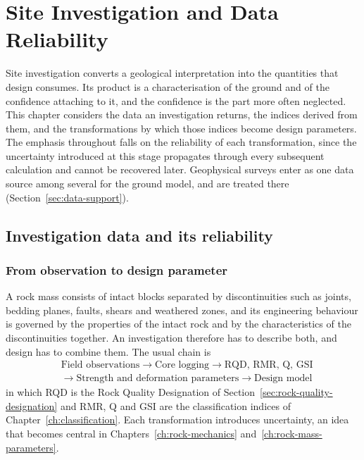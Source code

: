 \chapter{Site Investigation and Data Reliability}
\label{ch:site-investigation}

Site investigation converts a geological interpretation into the quantities
that design consumes. Its product is a
characterisation of the ground and of the confidence attaching to it, and the
confidence is the part more often neglected. This chapter
considers the data an investigation returns, the indices derived from them,
and the transformations by which those indices become design parameters. The
emphasis throughout falls on the reliability of each transformation, since the
uncertainty introduced at this stage propagates through every subsequent
calculation and cannot be recovered later. Geophysical surveys enter as one
data source among several for the ground model, and are treated there
(Section~\ref{sec:data-support}).

\section{Investigation data and its reliability}
\label{sec:investigation-data-and-its-reliability}

\subsection{From observation to design parameter}
\label{sec:observation-to-parameter}

A rock mass consists of intact blocks
separated by discontinuities such as joints, bedding planes, faults, shears
and weathered zones, and its engineering behaviour is governed by the
properties of the intact rock and by the characteristics of the
discontinuities together. An investigation therefore has to describe both,
and design has to combine them. The usual chain is
\[
\begin{aligned}
&\text{Field observations} \rightarrow \text{Core logging}
\rightarrow \text{RQD, RMR, Q, GSI} \\
&\rightarrow \text{Strength and deformation parameters}
\rightarrow \text{Design model}
\end{aligned}
\]
in which RQD is the Rock Quality Designation of
Section~\ref{sec:rock-quality-designation} and RMR, Q and GSI are the
classification indices of Chapter~\ref{ch:classification}. Each
transformation introduces uncertainty, an idea that becomes central in
Chapters~\ref{ch:rock-mechanics} and~\ref{ch:rock-mass-parameters}.


